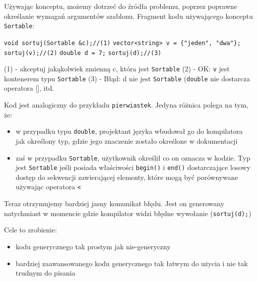 \documentclass[11pt, a4paper]{article}
\begin{document}
Używając konceptu, możemy dotrzeć do źródła problemu, poprzez poprawne określanie wymagań argumentów szablonu. Fragment kodu używającego konceptu \verb#Sortable#:\newline

\noindent \verb#void sortuj(Sortable &c);//(1)#\newline
\verb#vector<string> v = {"jeden", "dwa"};#\newline
\verb#sortuj(v);//(2)# \newline
\verb#double d = 7;# \newline
\verb#sortuj(d);//(3)# \newline

\noindent (1) - akceptuj jakąkolwiek zmienną c, która jest \verb#Sortable# \newline
(2) - OK: \verb#v# jest kontenerem typu \verb#Sortable# \newline
(3) - Błąd: d nie jest \verb#Sortable# (\verb#double# nie dostarcza operatora [], itd. \newline

Kod jest analogiczny do przykładu \verb#pierwiastek#. Jedyna różnica polega na tym, że:
\begin{itemize}

\item w przypadku typu \verb#double#, projektant języka wbudował go do kompilatora jak określony typ, gdzie jego znaczenie zostało określone w dokumentacji

\item zaś w przypadku \verb#Sortable#, użytkownik określił co on oznacza w kodzie. Typ jest \verb#Sortable# jeśli posiada właściwości \verb#begin()# i \verb#end()# dostarczające losowy dostęp do sekwencji zawierającej elementy, które mogą być porównywane używając operatora \verb#<#

\end{itemize}

Teraz otrzymujemy bardziej jasny komunikat błędu. Jest on generowany natychmiast w momencie gdzie kompilator widzi błędne wywołanie (\verb#sortuj(d);#)

Cele to zrobienie:
\begin{itemize}

\item kodu generycznego tak prostym jak nie-generyczny

\item bardziej zaawansowanego kodu generycznego tak łatwym do użycia i nie tak trudnym do
pisania

\end{itemize}
\end{document}

